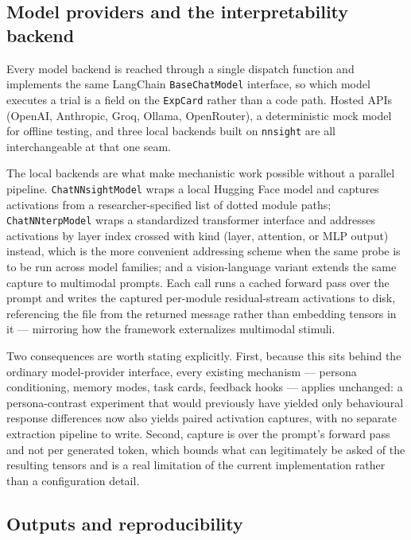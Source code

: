 \documentclass[11pt]{article}
\begin{document}
\subsection{Model providers and the interpretability backend}
\label{sec:interp-backend}

Every model backend is reached through a single dispatch function and
implements the same LangChain \texttt{BaseChatModel} interface, so which
model executes a trial is a field on the \texttt{ExpCard} rather than a code
path. Hosted APIs (OpenAI, Anthropic, Groq, Ollama, OpenRouter), a
deterministic mock model for offline testing, and three local backends
built on \texttt{nnsight} are all interchangeable at that one seam.

The local backends are what make mechanistic work possible without a
parallel pipeline. \texttt{ChatNNsightModel} wraps a local Hugging Face
model and captures activations from a researcher-specified list of dotted
module paths; \texttt{ChatNNterpModel} wraps a standardized transformer
interface and addresses activations by layer index crossed with kind
(layer, attention, or MLP output) instead, which is the more convenient
addressing scheme when the same probe is to be run across model families;
and a vision-language variant extends the same capture to multimodal
prompts. Each call runs a cached forward pass over the prompt and writes
the captured per-module residual-stream activations to disk, referencing
the file from the returned message rather than embedding tensors in it ---
mirroring how the framework externalizes multimodal stimuli.

Two consequences are worth stating explicitly. First, because this sits
behind the ordinary model-provider interface, every existing mechanism ---
persona conditioning, memory modes, task cards, feedback hooks --- applies
unchanged: a persona-contrast experiment that would previously have
yielded only behavioural response differences now also yields paired
activation captures, with no separate extraction pipeline to write.
Second, capture is over the prompt's forward pass and not per generated
token, which bounds what can legitimately be asked of the resulting
tensors and is a real limitation of the current implementation rather than
a configuration detail.

\subsection{Outputs and reproducibility}
\label{sec:outputs}
\end{document}
